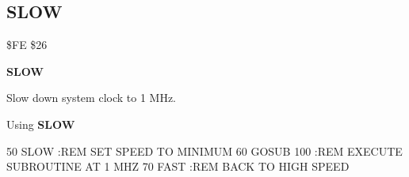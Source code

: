 \subsection{SLOW}
\begin{description}[leftmargin=3cm,style=nextline]
\item [Token:] \$FE \$26
\item [Format:] {\bf SLOW}
\item [Usage:] Slow down system clock to 1 MHz.

\item [Example:] Using {\bf SLOW}
\begin{screenoutput}
50 SLOW      :REM SET SPEED TO MINIMUM
60 GOSUB 100 :REM EXECUTE SUBROUTINE AT 1 MHZ
70 FAST      :REM BACK TO HIGH SPEED
\end{screenoutput}
\end{description}


\newpage
